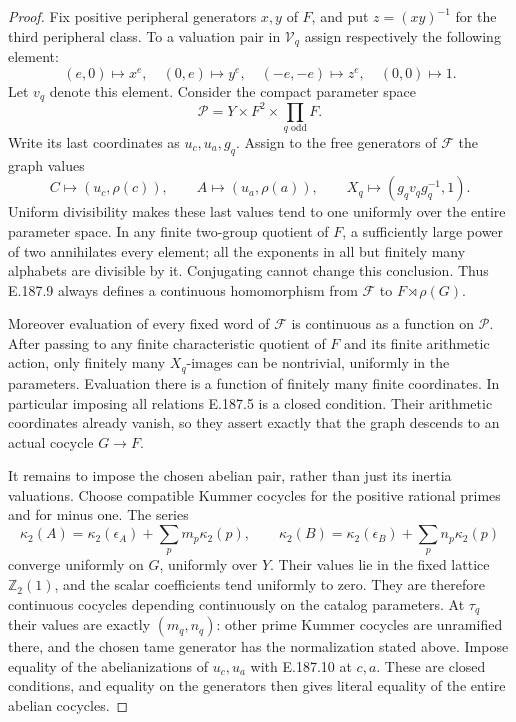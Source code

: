 \begin{proof}
Fix positive peripheral generators \(x,y\) of \(F\),
and put \(z=(xy)^{-1}\) for the third peripheral class.
To a valuation pair in \(\mathcal V_q\) assign respectively
the following element:
\[
 (e,0)\mapsto x^e,\quad
 (0,e)\mapsto y^e,\quad
 (-e,-e)\mapsto z^e,\quad
 (0,0)\mapsto1.
 \tag{E.187.7}
\]
Let \(v_q\) denote this element. Consider the compact
parameter space
\[
             \mathcal P=Y\times F^2\times\prod_{q\text{ odd}}F.
 \tag{E.187.8}
\]
Write its last coordinates as \(u_c,u_a,g_q\). Assign
to the free generators of \(\mathcal F\) the graph values
\[
 C\mapsto(u_c,\rho(c)),\qquad
 A\mapsto(u_a,\rho(a)),\qquad
 X_q\mapsto(g_qv_qg_q^{-1},1).
 \tag{E.187.9}
\]
Uniform divisibility makes these last values tend to one
uniformly over the entire parameter space. In any finite
two-group quotient of \(F\), a sufficiently large power
of two annihilates every element; all the exponents in
all but finitely many alphabets are divisible by it.
Conjugating cannot change this conclusion. Thus E.187.9
always defines a continuous homomorphism from
\(\mathcal F\) to \(F\rtimes\rho(G)\).

Moreover evaluation of every fixed word of \(\mathcal F\)
is continuous as a function on \(\mathcal P\). After
passing to any finite characteristic quotient of \(F\)
and its finite arithmetic action, only finitely many
\(X_q\)-images can be nontrivial, uniformly in the
parameters. Evaluation there is a function of finitely
many finite coordinates. In particular imposing all
relations E.187.5 is a closed condition. Their arithmetic
coordinates already vanish, so they assert exactly that
the graph descends to an actual cocycle \(G\to F\).

It remains to impose the chosen abelian pair, rather
than just its inertia valuations. Choose compatible
Kummer cocycles for the positive rational primes and
for minus one. The series
\[
 \kappa_2(A)=\kappa_2(\epsilon_A)+\sum_p m_p\kappa_2(p),
 \qquad
 \kappa_2(B)=\kappa_2(\epsilon_B)+\sum_p n_p\kappa_2(p)
 \tag{E.187.10}
\]
converge uniformly on \(G\), uniformly over \(Y\).
Their values lie in the fixed lattice \(\mathbb Z_2(1)\),
and the scalar coefficients tend uniformly to zero.
They are therefore continuous cocycles depending
continuously on the catalog parameters. At \(\tau_q\)
their values are exactly \((m_q,n_q)\): other prime
Kummer cocycles are unramified there, and the chosen
tame generator has the normalization stated above.
Impose equality of the abelianizations of \(u_c,u_a\)
with E.187.10 at \(c,a\). These are closed conditions,
and equality on the generators then gives literal
equality of the entire abelian cocycles.


\end{proof}
